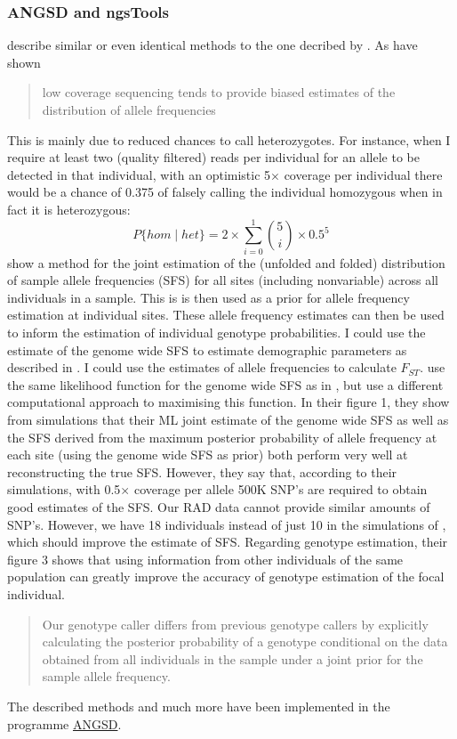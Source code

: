 \documentclass{article}\usepackage[]{graphicx}\usepackage[]{color}
\begin{document}
\subsubsection{ANGSD and ngsTools}
\cite{Nielsen2012} describe similar or even identical methods to the one decribed by \cite{Li2011}. As \cite{Johnson2008} have shown
\begin{quote}
low coverage sequencing tends to provide biased estimates of the distribution of allele frequencies
\end{quote}
This is mainly due to reduced chances to call heterozygotes. For instance, when I require at least two (quality filtered) reads per individual for an allele to be detected in that individual, with an optimistic 5$\times$ coverage per individual there would be a chance of 0.375 of falsely calling the individual homozygous when in fact it is heterozygous:
\begin{equation}
P\{hom \mid het\} = 2\times \sum_{i=0}^{1} \binom{5}{i}\times 0.5^{5}
\end{equation}
\cite{Nielsen2012} show a method for the joint estimation of the (unfolded and folded) distribution of sample allele frequencies (SFS) for all sites (including nonvariable) across all individuals in a sample. This is is then used as a prior for allele frequency estimation at individual sites. These allele frequency estimates can then be used to inform the estimation of individual genotype probabilities. I could use the estimate of the genome wide SFS to estimate demographic parameters as described in \cite{Gutenkunst2009}. I could use the estimates of allele frequencies to calculate $F_{ST}$. \cite{Nielsen2012} use the same likelihood function for the genome wide SFS as in \cite{Li2011}, but use a different computational approach to maximising this function. In their figure 1, they show from simulations that their ML joint estimate of the genome wide SFS as well as the SFS derived from the maximum posterior probability of allele frequency at each site (using the genome wide SFS as prior) both perform very well at reconstructing the true SFS. However, they say that, according to their simulations, with 0.5$\times$ coverage per allele 500K SNP's are required to obtain good estimates of the SFS. Our RAD data cannot provide similar amounts of SNP's. However, we have 18 individuals instead of just 10 in the simulations of \cite{Nielsen2012}, which should improve the estimate of SFS. Regarding genotype estimation, their figure 3 shows that using information from other individuals of the same population can greatly improve the accuracy of genotype estimation of the focal individual.
\begin{quote}
Our genotype caller differs from previous genotype callers by explicitly calculating the posterior probability of a genotype conditional on the data obtained from all individuals in the sample under a joint prior for the sample allele frequency.
\end{quote}
The described methods and much more have been implemented in the programme \href{http://www.popgen.dk/angsd/index.php/Main_Page#Overview}{ANGSD}.
\end{document}

